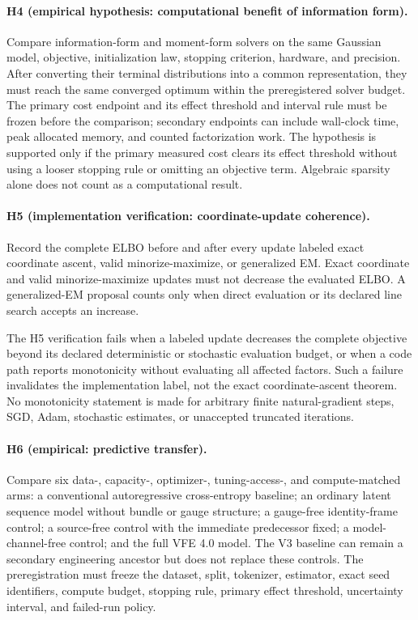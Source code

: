 \paragraph{H4 (empirical hypothesis: computational benefit of information form).}
Compare information-form and moment-form solvers on the same Gaussian model, objective, initialization law, stopping criterion, hardware, and precision. After converting their terminal distributions into a common representation, they must reach the same converged optimum within the preregistered solver budget. The primary cost endpoint and its effect threshold and interval rule must be frozen before the comparison; secondary endpoints can include wall-clock time, peak allocated memory, and counted factorization work. The hypothesis is supported only if the primary measured cost clears its effect threshold without using a looser stopping rule or omitting an objective term. Algebraic sparsity alone does not count as a computational result.

\paragraph{H5 (implementation verification: coordinate-update coherence).}
Record the complete ELBO before and after every update labeled exact coordinate ascent, valid minorize-maximize, or generalized EM. Exact coordinate and valid minorize-maximize updates must not decrease the evaluated ELBO. A generalized-EM proposal counts only when direct evaluation or its declared line search accepts an increase.

The H5 verification fails when a labeled update decreases the complete objective beyond its declared deterministic or stochastic evaluation budget, or when a code path reports monotonicity without evaluating all affected factors. Such a failure invalidates the implementation label, not the exact coordinate-ascent theorem. No monotonicity statement is made for arbitrary finite natural-gradient steps, SGD, Adam, stochastic estimates, or unaccepted truncated iterations.

\paragraph{H6 (empirical: predictive transfer).}
Compare six data-, capacity-, optimizer-, tuning-access-, and compute-matched arms: a conventional autoregressive cross-entropy baseline; an ordinary latent sequence model without bundle or gauge structure; a gauge-free identity-frame control; a source-free control with the immediate predecessor fixed; a model-channel-free control; and the full VFE 4.0 model. The V3 baseline can remain a secondary engineering ancestor but does not replace these controls. The preregistration must freeze the dataset, split, tokenizer, estimator, exact seed identifiers, compute budget, stopping rule, primary effect threshold, uncertainty interval, and failed-run policy.

